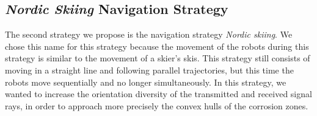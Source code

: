 \subsection{\textit{Nordic Skiing} Navigation Strategy}

The second strategy we propose is the navigation strategy \textit{Nordic skiing}.
We chose this name for this strategy because the movement of the robots during this strategy is similar to the movement of a skier's skis.
This strategy still consists of moving in a straight line and following parallel trajectories, but this time the robots move sequentially and no longer simultaneously.
In this strategy, we wanted to increase the orientation diversity of the transmitted and received signal rays, in order to approach more precisely the convex hulls of the corrosion zones.

